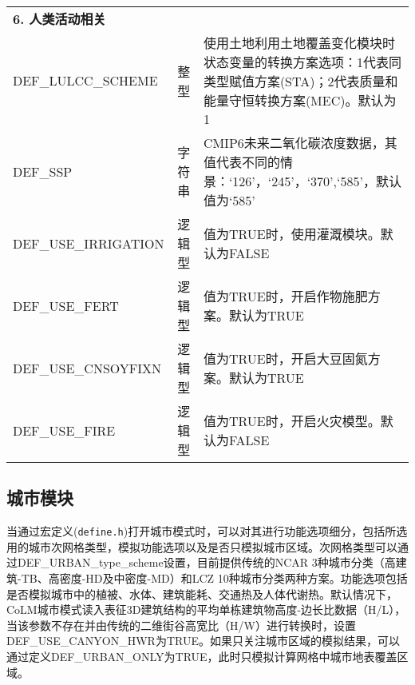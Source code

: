 \documentclass[a4paper,12pt,twoside]{article}
\begin{document}
{\begin{longtable}[!htbp]{lcp{}}
\textbf{6. 人类活动相关} && \\

DEF\_LULCC\_SCHEME & 整型 & 使用土地利用土地覆盖变化模块时状态变量的转换方案选项：1代表同类型赋值方案(STA)；2代表质量和能量守恒转换方案(MEC)。默认为1 \\
DEF\_SSP & 字符串 &  CMIP6未来二氧化碳浓度数据，其值代表不同的情景：`126'，`245'，`370',`585'，默认值为`585' \\
DEF\_USE\_IRRIGATION & 逻辑型 & 值为TRUE时，使用灌溉模块。默认为FALSE \\
DEF\_USE\_FERT & 逻辑型 & 值为TRUE时，开启作物施肥方案。默认为TRUE\\
DEF\_USE\_CNSOYFIXN & 逻辑型 & 值为TRUE时，开启大豆固氮方案。默认为TRUE \\
DEF\_USE\_FIRE & 逻辑型 & 值为TRUE时，开启火灾模型。默认为FALSE \\

\end{longtable}}

\subsection{城市模块}

当通过宏定义(\texttt {define.h})打开城市模式时，可以对其进行功能选项细分，包括所选用的城市次网格类型，模拟功能选项以及是否只模拟城市区域。次网格类型可以通过DEF\_URBAN\_type\_scheme设置，目前提供传统的NCAR 3种城市分类（高建筑-TB、高密度-HD及中密度-MD）和LCZ 10种城市分类两种方案。功能选项包括是否模拟城市中的植被、水体、建筑能耗、交通热及人体代谢热。默认情况下，CoLM城市模式读入表征3D建筑结构的平均单栋建筑物高度-边长比数据（H/L），当该参数不存在并由传统的二维街谷高宽比（H/W）进行转换时，设置DEF\_USE\_CANYON\_HWR为TRUE。如果只关注城市区域的模拟结果，可以通过定义DEF\_URBAN\_ONLY为TRUE，此时只模拟计算网格中城市地表覆盖区域。
\end{document}
